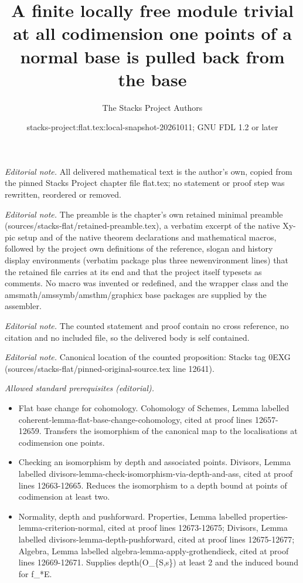\documentclass[10pt,a4paper]{amsart}
\title{A finite locally free module trivial at all codimension one points of a normal base is pulled back from the base}
\author{The Stacks Project Authors}
\date{stacks-project:flat.tex:local-snapshot-20261011; GNU FDL 1.2 or later}
\theoremstyle{plain}
\theoremstyle{definition}
\theoremstyle{remark}
\numberwithin{equation}{subsection}
\begin{document}
\maketitle
\noindent\textit{Editorial note.} All delivered mathematical text is the author's own, copied from the pinned Stacks Project chapter file flat.tex; no statement or proof step was rewritten, reordered or removed.\par\medskip
\noindent\textit{Editorial note.} The preamble is the chapter's own retained minimal preamble (sources/stacks-flat/retained-preamble.tex), a verbatim excerpt of the native Xy-pic setup and of the native theorem declarations and mathematical macros, followed by the project own definitions of the reference, slogan and history display environments (verbatim package plus three newenvironment lines) that the retained file carries at its end and that the project itself typesets as comments. No macro was invented or redefined, and the wrapper class and the amsmath/amssymb/amsthm/graphicx base packages are supplied by the assembler.\par\medskip
\noindent\textit{Editorial note.} The counted statement and proof contain no cross reference, no citation and no included file, so the delivered body is self contained.\par\medskip
\noindent\textit{Editorial note.} Canonical location of the counted proposition: Stacks tag 0EXG (sources/stacks-flat/pinned-original-source.tex line 12641).\par\medskip
\noindent\textit{Allowed standard prerequisites (editorial).}\begin{itemize}
\item Flat base change for cohomology. Cohomology of Schemes, Lemma labelled coherent-lemma-flat-base-change-cohomology, cited at proof lines 12657-12659. Transfers the isomorphism of the canonical map to the localisations at codimension one points.
\item Checking an isomorphism by depth and associated points. Divisors, Lemma labelled divisors-lemma-check-isomorphism-via-depth-and-ass, cited at proof lines 12663-12665. Reduces the isomorphism to a depth bound at points of codimension at least two.
\item Normality, depth and pushforward. Properties, Lemma labelled properties-lemma-criterion-normal, cited at proof lines 12673-12675; Divisors, Lemma labelled divisors-lemma-depth-pushforward, cited at proof lines 12675-12677; Algebra, Lemma labelled algebra-lemma-apply-grothendieck, cited at proof lines 12669-12671. Supplies depth(O\_\{S,s\}) at least 2 and the induced bound for f\_*E.
\end{itemize}\medskip
\end{document}
